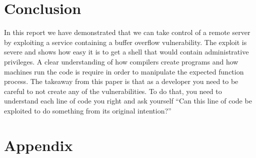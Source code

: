 \documentclass[12pt]{article}
\begin{document}
\section{Conclusion}
\label{sect:conclusion}
In this report we have demonstrated that we can take control of a remote
server by exploiting a service containing a buffer overflow vulnerability. 
The exploit is severe and shows how easy it is to get a shell that would
contain administrative privileges. A clear understanding of how compilers
create programs and how machines run the code is require in order to 
manipulate the expected function process. The takeaway from this paper is
that as a developer you need to be careful to not create any of the 
vulnerabilities. To do that, you need to understand each line of code you
right and ask yourself ``Can this line of code be exploited to do something
from its original intention?''

\nocite{*}



\section*{Appendix}
\label{sect:appendix}

\end{document}
